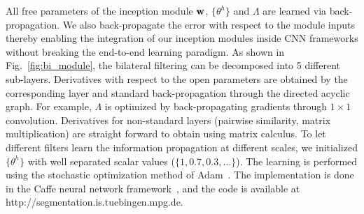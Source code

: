 All free parameters of the inception module $\mathbf{w}$, $\{\theta^h\}$ and $\Lambda$ are learned
via back-propagation. We also back-propagate the error with respect to the module inputs
thereby enabling the integration of our inception modules inside CNN frameworks without
breaking the end-to-end learning paradigm.
As shown in Fig.~\ref{fig:bi_module}, the bilateral filtering
can be decomposed into 5 different sub-layers.
Derivatives with respect to the open parameters are obtained by the
corresponding layer and standard back-propagation through the directed
acyclic graph.
For example, $\Lambda$ is optimized by back-propagating gradients through $1\times1$ convolution.
Derivatives for non-standard layers (pairwise similarity, matrix
multiplication) are straight forward to obtain using matrix calculus.
To let different filters learn the information propagation at
different scales, we initialized $\{\theta^h\}$ with well separated
scalar values (\eg $\{1, 0.7, 0.3,...\}$).
The learning is performed using the stochastic optimization
method of Adam~\cite{kingma2014adam}.
The implementation is done in the Caffe neural network framework~\cite{jia2014caffe},
and the code is available at http://segmentation.is.tuebingen.mpg.de.



